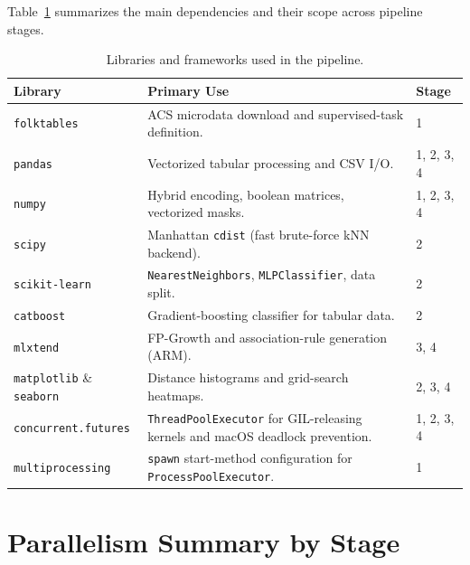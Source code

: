Table~\ref{tab:libraries} summarizes the main dependencies and their scope across pipeline stages.
\begin{table}[H]
\centering
\renewcommand{\arraystretch}{1.2}
\caption{Libraries and frameworks used in the pipeline.}
\label{tab:libraries}
\begin{tabular}{>{\raggedright\arraybackslash}p{} p{} p{}}
  \toprule
  \textbf{Library} & \textbf{Primary Use} & \textbf{Stage} \\
  \midrule
  \texttt{folktables}         & ACS microdata download and supervised-task definition. & 1 \\
  \texttt{pandas}             & Vectorized tabular processing and CSV I/O.            & 1, 2, 3, 4 \\
  \texttt{numpy}              & Hybrid encoding, boolean matrices, vectorized masks.  & 1, 2, 3, 4 \\
  \texttt{scipy}              & Manhattan \texttt{cdist} (fast brute-force kNN backend). & 2 \\
  \texttt{scikit-learn}       & \texttt{NearestNeighbors}, \texttt{MLPClassifier}, data split. & 2 \\
  \texttt{catboost}           & Gradient-boosting classifier for tabular data.        & 2 \\
  \texttt{mlxtend}            & FP-Growth and association-rule generation (ARM).      & 3, 4 \\
  \texttt{matplotlib} \& \texttt{seaborn} & Distance histograms and grid-search heatmaps. & 2, 3, 4 \\
  \texttt{concurrent.\allowbreak futures} & \texttt{ThreadPoolExecutor} for GIL-releasing kernels and macOS deadlock prevention. & 1, 2, 3, 4 \\
  \texttt{multiprocessing}    & \texttt{spawn} start-method configuration for \texttt{ProcessPoolExecutor}. & 1 \\
  \bottomrule
\end{tabular}
\renewcommand{\arraystretch}{1.0}
\end{table}

\section{Parallelism Summary by Stage}
\label{app:parallelism-summary}

